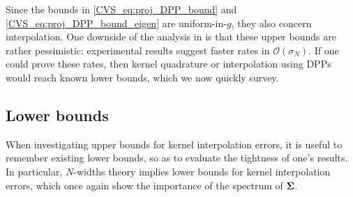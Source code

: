 \documentclass[twoside,11pt]{book}
\numberwithin{theorem}{chapter}
\numberwithin{definition}{chapter}
\numberwithin{proposition}{chapter}
\numberwithin{corollary}{chapter}
\numberwithin{example}{chapter}
\numberwithin{lemma}{chapter}
\numberwithin{assumption}{chapter}
\newcommand{\pc}[1]{\textcolor{blue}{#1}}
\begin{document}
Since the bounds in \eqref{CVS_eq:proj_DPP_bound} and \eqref{CVS_eq:proj_DPP_bound_eigen} are uniform-in-$g$, they also concern interpolation. One downside of the analysis in \citep{BeBaCh19} is that these upper bounds are rather pessimistic: experimental results suggest faster rates in $\mathcal{O}(\sigma_{N})$. If one could prove these rates, then kernel quadrature or interpolation using DPPs would reach known lower bounds, which we now quickly survey.



\subsection{Lower bounds}\label{CVS_sec:lower_bounds}
When investigating upper bounds for kernel interpolation errors, it is useful to remember existing lower bounds, so as to evaluate the tightness of one's results. In particular, $N$-widths theory \citep{Pin12} implies lower bounds for kernel interpolation errors, which once again show the importance of the spectrum of $\bm{\Sigma}$.
\end{document}

